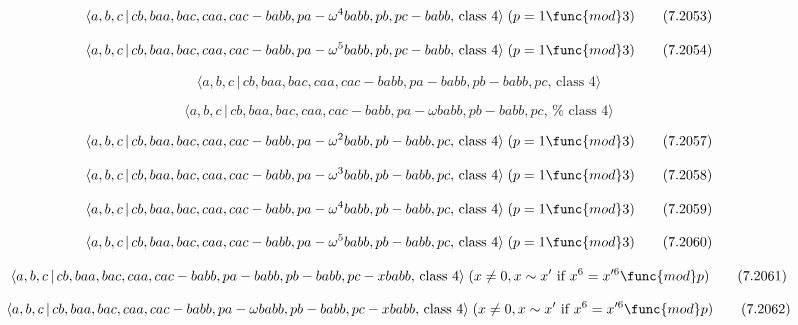 \documentclass[10pt]{article}
\begin{document}
\begin{equation}
\langle a,b,c\,|\,cb,baa,bac,caa,cac-babb,pa-\omega ^{4}babb,pb,pc-babb,\,%
\text{class }4\rangle \;(p=1\func{mod}3)  \tag{7.2053}
\end{equation}

\begin{equation}
\langle a,b,c\,|\,cb,baa,bac,caa,cac-babb,pa-\omega ^{5}babb,pb,pc-babb,\,%
\text{class }4\rangle \;(p=1\func{mod}3)  \tag{7.2054}
\end{equation}

\begin{equation}
\langle a,b,c\,|\,cb,baa,bac,caa,cac-babb,pa-babb,pb-babb,pc,\,\text{class }%
4\rangle  \tag{7.2055}
\end{equation}

\begin{equation}
\langle a,b,c\,|\,cb,baa,bac,caa,cac-babb,pa-\omega babb,pb-babb,pc,\,\text{%
class }4\rangle  \tag{7.2056}
\end{equation}

\begin{equation}
\langle a,b,c\,|\,cb,baa,bac,caa,cac-babb,pa-\omega ^{2}babb,pb-babb,pc,\,%
\text{class }4\rangle \;(p=1\func{mod}3)  \tag{7.2057}
\end{equation}

\begin{equation}
\langle a,b,c\,|\,cb,baa,bac,caa,cac-babb,pa-\omega ^{3}babb,pb-babb,pc,\,%
\text{class }4\rangle \;(p=1\func{mod}3)  \tag{7.2058}
\end{equation}

\begin{equation}
\langle a,b,c\,|\,cb,baa,bac,caa,cac-babb,pa-\omega ^{4}babb,pb-babb,pc,\,%
\text{class }4\rangle \;(p=1\func{mod}3)  \tag{7.2059}
\end{equation}

\begin{equation}
\langle a,b,c\,|\,cb,baa,bac,caa,cac-babb,pa-\omega ^{5}babb,pb-babb,pc,\,%
\text{class }4\rangle \;(p=1\func{mod}3)  \tag{7.2060}
\end{equation}

\begin{equation}
\langle a,b,c\,|\,cb,baa,bac,caa,cac-babb,pa-babb,pb-babb,pc-xbabb,\,\text{%
class }4\rangle \;(x \neq 0, x \sim x^{\prime}\text{ if }x^6=x^{\prime 6 }%
\func{mod} p)  \tag{7.2061}
\end{equation}

\begin{equation}
\langle a,b,c\,|\,cb,baa,bac,caa,cac-babb,pa-\omega babb,pb-babb,pc-xbabb,\,%
\text{class }4\rangle \;(x\neq 0,x \sim x^{\prime }\text{ if }x^6=x^{\prime
6}\func{mod}p)  \tag{7.2062}
\end{equation}
\end{document}

